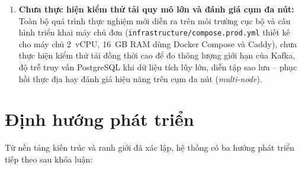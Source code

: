 \begin{enumerate}
  \item \textbf{Chưa thực hiện kiểm thử tải quy mô lớn và đánh giá cụm đa nút:} Toàn bộ quá trình thực nghiệm mới diễn ra trên môi trường cục bộ và cấu hình triển khai máy chủ đơn (\texttt{infrastructure/\hspace{0pt}compose.\hspace{0pt}prod.\hspace{0pt}yml} thiết kế cho máy chủ 2~vCPU, 16~GB RAM dùng Docker Compose và Caddy), chưa thực hiện kiểm thử tải đồng thời cao để đo thông lượng giới hạn của Kafka, độ trễ truy vấn PostgreSQL khi dữ liệu tích lũy lớn, diễn tập sao lưu -- phục hồi thực địa hay đánh giá hiệu năng trên cụm đa nút (\emph{multi-node}).
\end{enumerate}

\section{Định hướng phát triển}
Từ nền tảng kiến trúc và ranh giới đã xác lập, hệ thống có ba hướng phát triển tiếp theo sau khóa luận:

